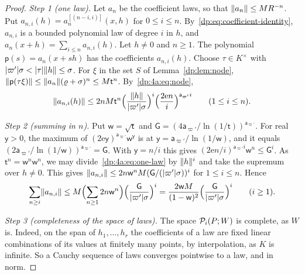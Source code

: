 \begin{proof}
\emph{Step 1 (one law).} Let $a_n$ be the coefficient laws, so that $\lVert a_n\rVert\le MR^{-n}$. Put $a_{n,i}(h)=a_n^{[(n-i,i)]}(x,h)$ for $0\le i\le n$. By~\eqref{dp:eq:coefficient-identity}, $a_{n,i}$ is a bounded polynomial law of degree $i$ in $h$, and $a_n(x+h)=\sum_{i\le n}a_{n,i}(h)$. Let $h\ne0$ and $n\ge1$. The polynomial $\mathsf p(s)=a_n(x+sh)$ has the coefficients $a_{n,i}(h)$. Choose $\tau\in K^\times$ with $\lvert \varpi'\rvert\sigma<\lvert \tau\rvert\lVert h\rVert\le\sigma$. For $\xi$ in the set $S$ of Lemma~\ref{dp:lem:node}, $\lVert \mathsf p(\tau\xi)\rVert\le\lVert a_n\rVert(\varrho+\sigma)^n\le M\mathsf t^n$. By~\eqref{dp:4a:eq:node},
\begin{equation}\label{dp:4a:eq:one-law}
 \lVert a_{n,i}(h)\rVert\le2nM\mathsf t^n\Bigl(\frac{\lVert h\rVert}{\lvert \varpi'\rvert\sigma}\Bigr)^i\Bigl(\frac{2\mathrm en}i\Bigr)^{\mathsf a_{\varpi'} i}\qquad(1\le i\le n).
\end{equation}

\emph{Step 2 (summing in $n$).} Put $\mathsf w=\sqrt{\mathsf t}$ and $\mathsf G=(4\mathsf a_{\varpi'}/\ln(1/\mathsf t))^{\mathsf a_{\varpi'}}$. For real $\mathsf y>0$, the maximum of $(2\mathrm e\mathsf y)^{\mathsf a_{\varpi'}}\mathsf w^{\mathsf y}$ is at $\mathsf y=\mathsf a_{\varpi'}/\ln(1/\mathsf w)$, and it equals $(2\mathsf a_{\varpi'}/\ln(1/\mathsf w))^{\mathsf a_{\varpi'}}=\mathsf G$. With $\mathsf y=n/i$ this gives $(2\mathrm en/i)^{\mathsf a_{\varpi'} i}\mathsf w^n\le\mathsf G^i$. As $\mathsf t^n=\mathsf w^n\mathsf w^n$, we may divide~\eqref{dp:4a:eq:one-law} by $\lVert h\rVert^i$ and take the supremum over $h\ne0$. This gives $\lVert a_{n,i}\rVert\le2n\mathsf w^nM(\mathsf G/(\lvert \varpi'\rvert\sigma))^i$ for $1\le i\le n$. Hence
\begin{equation}\label{dp:4a:eq:sum-n}
 \sum_{n\ge i}\lVert a_{n,i}\rVert\le M\Bigl(\sum_{n\ge1}2n\mathsf w^n\Bigr)\Bigl(\frac{\mathsf G}{\lvert \varpi'\rvert\sigma}\Bigr)^i=\frac{2\mathsf wM}{(1-\mathsf w)^2}\Bigl(\frac{\mathsf G}{\lvert \varpi'\rvert\sigma}\Bigr)^i\qquad(i\ge1).
\end{equation}

\emph{Step 3 (completeness of the space of laws).} The space $\mathcal P_i(P;W)$ is complete, as $W$ is. Indeed, on the span of $h_1,\dots,h_r$ the coefficients of a law are fixed linear combinations of its values at finitely many points, by interpolation, as $K$ is infinite. So a Cauchy sequence of laws converges pointwise to a law, and in norm.


\end{proof}
